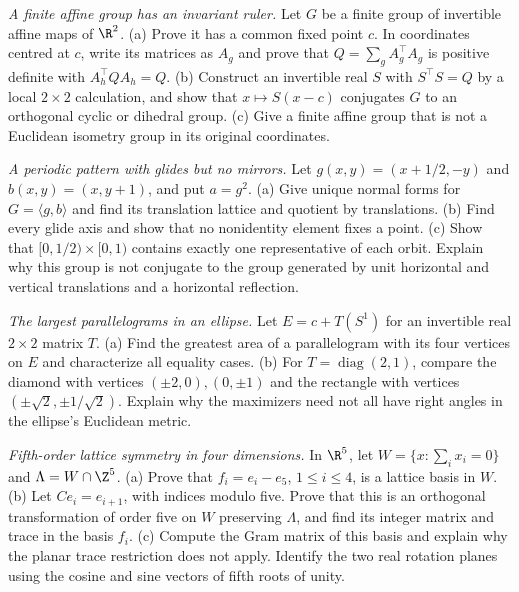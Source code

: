 \begin{exercise}[$\star\star\star$]\label{ex:v9-finite-affine-group}
\emph{A finite affine group has an invariant ruler.} Let $G$ be a finite group of invertible affine maps of $\R^2$. (a) Prove it has a common fixed point $c$. In coordinates centred at $c$, write its matrices as $A_g$ and prove that $Q=\sum_gA_g^\top A_g$ is positive definite with $A_h^\top QA_h=Q$. (b) Construct an invertible real $S$ with $S^\top S=Q$ by a local $2\times2$ calculation, and show that $x\mapsto S(x-c)$ conjugates $G$ to an orthogonal cyclic or dihedral group. (c) Give a finite affine group that is not a Euclidean isometry group in its original coordinates.
\end{exercise}
\begin{exercise}[$\star\star$]\label{ex:v9-glide-wallpaper}
\emph{A periodic pattern with glides but no mirrors.} Let $g(x,y)=(x+1/2,-y)$ and $b(x,y)=(x,y+1)$, and put $a=g^2$. (a) Give unique normal forms for $G=\langle g,b\rangle$ and find its translation lattice and quotient by translations. (b) Find every glide axis and show that no nonidentity element fixes a point. (c) Show that $[0,1/2)\times[0,1)$ contains exactly one representative of each orbit. Explain why this group is not conjugate to the group generated by unit horizontal and vertical translations and a horizontal reflection.
\end{exercise}
\begin{exercise}[$\star\star$]\label{ex:v9-ellipse-parallelogram}
\emph{The largest parallelograms in an ellipse.} Let $E=c+T(S^1)$ for an invertible real $2\times2$ matrix $T$. (a) Find the greatest area of a parallelogram with its four vertices on $E$ and characterize all equality cases. (b) For $T=\operatorname{diag}(2,1)$, compare the diamond with vertices $(\pm2,0),(0,\pm1)$ and the rectangle with vertices $(\pm\sqrt2,\pm1/\sqrt2)$. Explain why the maximizers need not all have right angles in the ellipse's Euclidean metric.
\end{exercise}
\begin{exercise}[$\star\star$]\label{ex:v9-four-dimensional-order-five}
\emph{Fifth-order lattice symmetry in four dimensions.} In $\R^5$, let $W=\{x:\sum_ix_i=0\}$ and $\Lambda=W\cap\Z^5$. (a) Prove that $f_i=e_i-e_5$, $1\le i\le4$, is a lattice basis in $W$. (b) Let $Ce_i=e_{i+1}$, with indices modulo five. Prove that this is an orthogonal transformation of order five on $W$ preserving $\Lambda$, and find its integer matrix and trace in the basis $f_i$. (c) Compute the Gram matrix of this basis and explain why the planar trace restriction does not apply. Identify the two real rotation planes using the cosine and sine vectors of fifth roots of unity.
\end{exercise}


